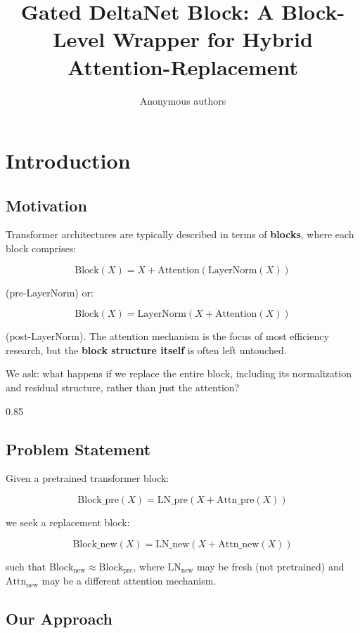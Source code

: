 \title{\textbf{Gated DeltaNet Block: A Block-Level Wrapper for Hybrid Attention-Replacement}}

\author{Anonymous authors}



\section{Introduction}

\subsection{Motivation}

Transformer architectures are typically described in terms of \textbf{blocks}, 
where each block comprises:

\[
\text{Block}(X) = X + \text{Attention}(\text{LayerNorm}(X))
\tag{1.1}
\]

(pre-LayerNorm) or:

\[
\text{Block}(X) = \text{LayerNorm}(X + \text{Attention}(X))
\tag{1.2}
\]

(post-LayerNorm). The attention mechanism is the focus of most efficiency 
research, but the \textbf{block structure itself} is often left untouched.

We ask: what happens if we replace the entire block, including its 
normalization and residual structure, rather than just the attention?

0.85


\subsection{Problem Statement}

Given a pretrained transformer block:

\[
\text{Block}\_\text{pre}(X) = \text{LN}\_\text{pre}(X + \text{Attn}\_\text{pre}(X))
\tag{1.3}
\]

we seek a replacement block:

\[
\text{Block}\_\text{new}(X) = \text{LN}\_\text{new}(X + \text{Attn}\_\text{new}(X))
\tag{1.4}
\]

such that $\text{Block}_\text{new} \approx \text{Block}_\text{pre}$, where 
$\text{LN}_\text{new}$ may be fresh (not pretrained) and $\text{Attn}_\text{new}$ 
may be a different attention mechanism.

\subsection{Our Approach}

